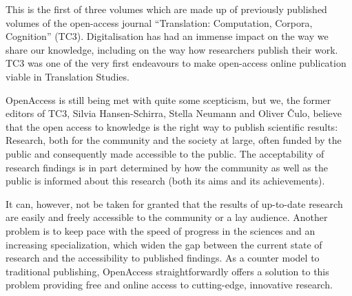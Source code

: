 



This is the first of three volumes which are made up of previously published volumes of the open-access journal ``Translation: Computation, Corpora, Cognition'' (TC3). Digitalisation has had an immense impact on the way we share our knowledge, including on the way how researchers publish their work. TC3 was one of the very first endeavours to make open-access online publication viable in Translation Studies. 

OpenAccess is still being met with quite some scepticism, but we, the former editors of TC3, Silvia Hansen-Schirra, Stella Neumann and Oliver Čulo, believe that the open access to knowledge is the right way to publish scientific results: Research, both for the community and the society at large, often funded by the public and consequently made accessible to the public. The acceptability of research findings is in part determined by how the community as well as the public is informed about this research (both its aims and its achievements). 

It can, however, not be taken for granted that the results of up-to-date research are easily and freely accessible to the community or a lay audience. Another problem is to keep pace with the speed of progress in the sciences and an increasing specialization, which widen the gap between the current state of research and the accessibility to published findings. As a counter model to traditional publishing, OpenAccess straightforwardly offers a solution to this problem providing free and online access to cutting-edge, innovative research.

